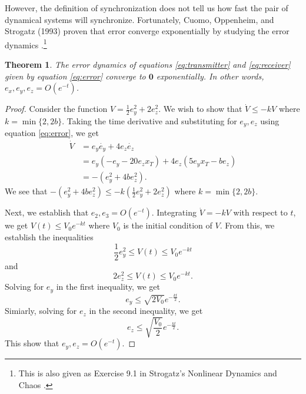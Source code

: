 \documentclass[12pt]{article}
\newtheorem{theorem}{Theorem}[section]
\begin{document}
      However, the definition of synchronization does not tell us how fast the pair of dynamical systems will synchronize. Fortunately, Cuomo, Oppenheim, and Strogatz (1993) proven that error converge exponentially by studying the error dynamics \cite{expProof}.\footnote{This is also given as Exercise 9.1 in Strogatz's Nonlinear Dynamics and Chaos \cite{strogatz2019nonlinear}.} 
      \begin{theorem}
        The error dynamics of equations \ref{eq:transmitter} and \ref{eq:receiver} given by equation \ref{eq:error} converge to $\mathbf{0}$ exponentially. In other words, $e_x, e_y, e_z = O(e^{-t})$. 
      \end{theorem}
      \begin{proof}
        Consider the function $V=\frac{1}{2}e_y^2 + 2e_z^2$. We wish to show that $\dot{V} \leq - k V$ where $k=\min\{2,2b\}$. Taking the time derivative and substituting for $e_y,e_z$ using equation \ref{eq:error}, we get
        \begin{align*}
          \dot{V} &= e_y \dot{e_y} + 4e_z \dot{e_z} \\ 
          &= e_y (-e_y - 20e_z x_T) + 4e_z (5e_y x_T - be_z) \\
          &= - (e_y^2 + 4be_z^2). 
        \end{align*}
        We see that $- (e_y^2 + 4be_z^2) \leq -k \left( \frac{1}{2} e_y^2 + 2e_z^2 \right)$ where $k=\min\{2,2b\}$. 

        Next, we establish that $e_2,e_3 = O(e^{-t})$. Integrating $\dot{V} = -kV$ with respect to $t$, we get $V(t) \leq V_0 e^{-kt}$ where $V_0$ is the initial condition of $V$. From this, we establish the inequalities 
        \begin{equation*}
          \frac{1}{2}e_y^2 \leq V(t) \leq V_0 e^{-kt}
        \end{equation*}
        and 
        \begin{equation*}
          2e_z^2 \leq V(t) \leq V_0 e^{-kt}. 
        \end{equation*}
        Solving for $e_y$ in the first inequality, we get 
        \begin{equation*}
          e_y \leq \sqrt{2V_0} e^{-\frac{kt}{2}}. 
        \end{equation*}
        Simiarly, solving for $e_z$ in the second inequality, we get 
        \begin{equation*} 
          e_z \leq \sqrt{\frac{V_0}{2}} e^{-\frac{kt}{2}}. 
        \end{equation*}
        This show that $e_y,e_z = O(e^{-t})$. 
        

\end{proof}
\end{document}
